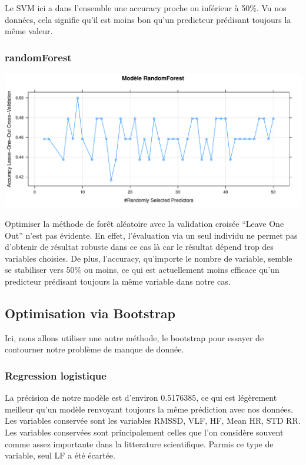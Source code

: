 \documentclass[]{article}
\begin{document}
Le SVM ici a dans l'ensemble une accuracy proche ou inférieur à 50\%. Vu
nos données, cela signifie qu'il est moins bon qu'un predicteur
prédisant toujours la même valeur.

\hypertarget{randomforest}{%
\subsubsection{randomForest}\label{randomforest}}

\includegraphics{repport_projet_files/figure-latex/unnamed-chunk-50-1.pdf}

Optimiser la méthode de forêt aléatoire avec la validation croisée
``Leave One Out'' n'est pas évidente. En effet, l'évaluation via un seul
individu ne permet pas d'obtenir de résultat robuste dans ce cas là car
le résultat dépend trop des variables choisies. De plus, l'accuracy,
qu'importe le nombre de variable, semble se stabiliser vers 50\% ou
moins, ce qui est actuellement moins efficace qu'un predicteur prédisant
toujours la même variable dans notre cas.

\hypertarget{optimisation-via-bootstrap}{%
\subsection{Optimisation via
Bootstrap}\label{optimisation-via-bootstrap}}

Ici, nous allons utiliser une autre méthode, le bootstrap pour essayer
de contourner notre problème de manque de donnée.

\hypertarget{regression-logistique-2}{%
\subsubsection{Regression logistique}\label{regression-logistique-2}}

La précision de notre modèle est d'environ 0.5176385, ce qui est
légèrement meilleur qu'un modèle renvoyant toujours la même prédiction
avec nos données. Les variables conservée sont les variables RMSSD, VLF,
HF, Mean HR, STD RR. Les variables conservées sont principalement celles
que l'on considère souvent comme assez importante dans la litterature
scientifique. Parmis ce type de variable, seul LF a été écartée.
\end{document}
